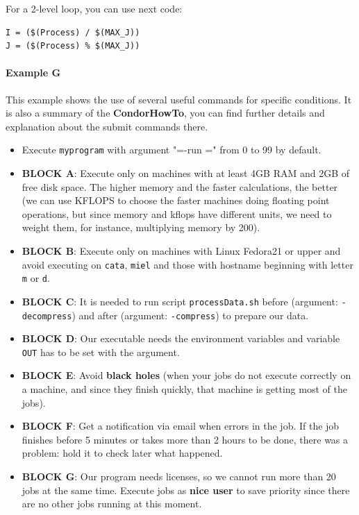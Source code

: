 \documentclass[a4paper,10pt]{article}
\begin{document}
For a 2-level loop, you can use next code:

\begin{verbatim}
I = ($(Process) / $(MAX_J))
J = ($(Process) % $(MAX_J))
\end{verbatim}

\paragraph{Example G}
\label{sec:org122f673}

This example shows the use of several useful commands for specific
conditions. It is also a summary of the \textbf{CondorHowTo}, you can find
further details and explanation about the submit commands there. 

\begin{itemize}
\item Execute \texttt{myprogram} with argument "=-run =" from 0 to 99 by default.
\item \textbf{BLOCK A}: Execute only on machines with at least 4GB RAM and 2GB of free
disk space. The higher memory and the faster calculations, the better (we can
use KFLOPS to choose the faster machines doing floating point operations, but
since memory and kflops have different units, we need to weight them, for
instance, multiplying memory by 200).
\item \textbf{BLOCK B}: Execute only on machines with Linux Fedora21 or upper and avoid
executing on \texttt{cata}, \texttt{miel} and those with hostname beginning with letter \texttt{m}
or \texttt{d}.
\item \textbf{BLOCK C}: It is needed to run script \texttt{processData.sh} before (argument:
\texttt{-decompress}) and after (argument: \texttt{-compress}) to prepare our data.
\item \textbf{BLOCK D}: Our executable needs the environment variables and variable \texttt{OUT}
has to be set with the argument.
\item \textbf{BLOCK E}: Avoid \textbf{black holes} (when your jobs do not execute correctly on
a machine, and since they finish quickly, that machine is getting most of the
jobs).
\item \textbf{BLOCK F}: Get a notification via email when errors in the job. If the job
finishes before 5 minutes or takes more than 2 hours to be done, there was a
problem: hold it to check later what happened.
\item \textbf{BLOCK G}: Our program needs licenses, so we cannot run more than 20 jobs at
the same time. Execute jobs as \textbf{nice user} to save priority since there are
no other jobs running at this moment.
\end{itemize}
\end{document}
